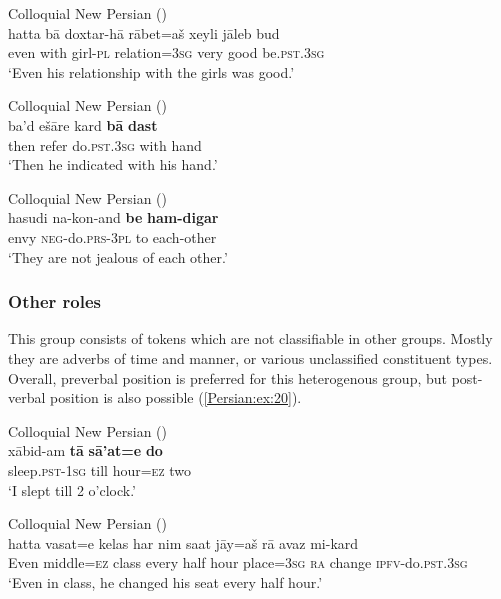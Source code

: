 \documentclass[output=paper,colorlinks,citecolor=brown,draftmode]{langscibook}
\begin{document}
\ea\label{Persian:ex:17}
Colloquial New Persian (\citealt[P, 1803]{Izadi2022Persian}) \\
\gll hatta bā doxtar-hā rābet=aš xeyli jāleb bud \\
even with girl\textsc{-pl} relation\textsc{=3sg} very good be\textsc{.pst.3sg} \\
\glt `Even his relationship with the girls was good.'
\z

\ea\label{Persian:ex:18}
Colloquial New Persian (\citealt[K, 1365]{Izadi2022Persian}) \\
\gll ba'd ešāre kard \textbf{bā} \textbf{dast} \\
then refer do\textsc{.pst.3sg} with hand \\
\glt `Then he indicated with his hand.'
\z

\ea\label{Persian:ex:19}
Colloquial New Persian (\citealt[P, 1819]{Izadi2022Persian}) \\
\gll hasudi na-kon-and \textbf{be} \textbf{ham-digar} \\
envy \textsc{neg-}do\textsc{.prs-3pl} to each-other \\
\glt `They are not jealous of each other.'
\z

\subsubsection{Other roles}

This group consists of tokens which are not classifiable in other groups. Mostly they are adverbs of time and manner, or various unclassified constituent types. Overall, preverbal position is preferred for this heterogenous group, but post-verbal position is also possible (\ref{Persian:ex:20}).

\ea\label{Persian:ex:20}
Colloquial New Persian (\citealt[P, 0005]{Izadi2022Persian}) \\
\gll xābid-am \textbf{tā} \textbf{sā'at=e} \textbf{do} \\
sleep\textsc{.pst-1sg} till hour\textsc{=ez} two \\
\glt `I slept till 2 o'clock.'
\z

\ea\label{Persian:ex:21}
Colloquial New Persian (\citealt[P, 1813]{Izadi2022Persian}) \\
\gll hatta {vasat=e} {kelas} {har} {nim} {saat} jāy=aš rā avaz mi-kard \\
Even middle\textsc{=ez} class every half hour place\textsc{=3sg} \textsc{ra} change \textsc{ipfv-}do\textsc{.pst.3sg} \\
\glt `Even in class, he changed his seat every half hour.'
\z
\end{document}
